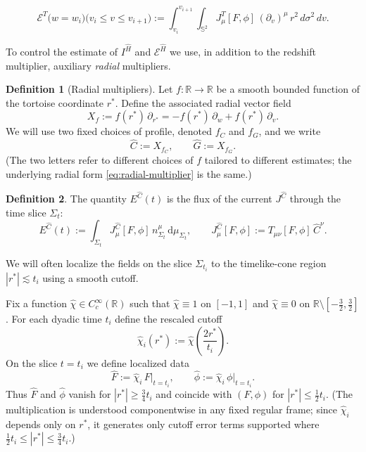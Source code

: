 \documentclass[11pt]{article}
\numberwithin{equation}{section}
\theoremstyle{plain}
\theoremstyle{definition}
\newtheorem{definition}{Definition}[section]
\theoremstyle{remark}
\newcommand{\dd}{\mathrm{d}}
\begin{document}
\begin{equation}\label{et}
\mathcal{E}^{T}\bigl(w=w_i\bigr)\bigl(v_i\le v\le v_{i+1}\bigr)
:=
\int_{v_i}^{v_{i+1}}\int_{\mathbb S^{2}}
J_\mu^{T}[F,\phi]\,(\partial_v)^\mu\, r^{2}\,d\sigma^{2}\,dv.
\end{equation}

To control the estimate of $I^{\hat{H}}$ and $\mathcal{E}^{\hat{H}}$ we use, in addition to the redshift multiplier, auxiliary \emph{radial} multipliers.

\begin{definition}[Radial multipliers]\label{def:radial-multiplier}
Let $f:\mathbb R\to\mathbb R$ be a smooth bounded function of the tortoise coordinate $r^{\ast}$.
Define the associated radial vector field
\begin{equation}\label{eq:radial-multiplier}
X_{f}:=f(r^{\ast})\,\partial_{r^{\ast}}
=
-f(r^{\ast})\,\partial_{w}
+
f(r^{\ast})\,\partial_{v}.
\end{equation}
We will use two fixed choices of profile, denoted $f_{C}$ and $f_{G}$, and we write
\begin{equation}
\hat C:=X_{f_{C}},\qquad \hat G:=X_{f_{G}}.
\end{equation}
(The two letters refer to different choices of $f$ tailored to different estimates; the underlying radial form \eqref{eq:radial-multiplier} is the same.)
\end{definition}

\begin{definition}
The quantity $E^{\hat C}(t)$ is the flux of the current $J^{\hat C}$ through the time slice $\Sigma_t$:
\begin{equation}\label{defEC}
E^{\hat C}(t)
:=
\int_{\Sigma_t} J_\mu^{\hat C}[F,\phi]\,n_{\Sigma_t}^{\mu}\,\dd\mu_{\Sigma_t},
\qquad
J_\mu^{\hat C}[F,\phi]:=T_{\mu\nu}[F,\phi]\,\hat C^{\nu}.
\end{equation}
\end{definition}

We will often localize the fields on the slice $\Sigma_{t_i}$ to the timelike-cone region $|r^{\ast}|\lesssim t_i$ using a smooth cutoff.

Fix a function $\hat\chi\in C_{c}^{\infty}(\mathbb R)$ such that $\hat\chi\equiv 1$ on $[-1,1]$ and $\hat\chi\equiv 0$ on $\mathbb R\setminus[-\tfrac32,\tfrac32]$.
For each dyadic time $t_i$ define the rescaled cutoff
\begin{equation}\label{eq:cone-cutoff}
\hat\chi_i(r^{\ast}):=\hat\chi\!\left(\frac{2r^{\ast}}{t_i}\right).
\end{equation}
On the slice $t=t_i$ we define localized data
\begin{equation}\label{eq:localized-data}
\hat F:=\hat\chi_i\,F\big|_{t=t_i},\qquad
\hat\phi:=\hat\chi_i\,\phi\big|_{t=t_i}.
\end{equation}
Thus $\hat F$ and $\hat\phi$ vanish for $|r^{\ast}|\ge \tfrac34 t_i$ and coincide with $(F,\phi)$ for $|r^{\ast}|\le \tfrac12 t_i$.
(The multiplication is understood componentwise in any fixed regular frame; since $\hat\chi_i$ depends only on $r^{\ast}$, it generates only cutoff error terms supported where $\tfrac12 t_i\le |r^{\ast}|\le \tfrac34 t_i$.)
\end{document}
